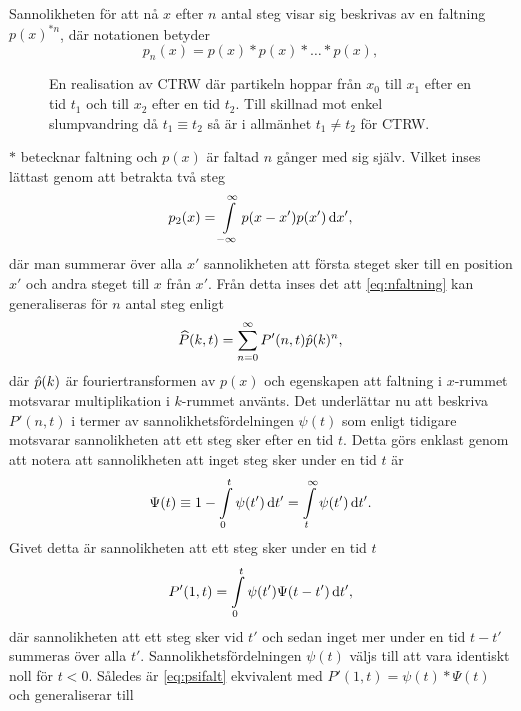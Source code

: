 Sannolikheten för att nå $x$ efter $n$ antal steg visar sig beskrivas av en faltning $p(x)^{*n}$, där notationen betyder 
\begin{equation}
p_n(x) = p(x)*p(x)*\ldots*p(x),
\end{equation}
\begin{figure}
    \centering
    
    \caption{En realisation av CTRW där partikeln hoppar från $x_0$ till $x_1$ efter en tid $t_1$ och till $x_2$ efter en tid $t_2$. Till skillnad mot enkel slumpvandring då $t_1\equiv t_2$ så är i allmänhet $t_1\neq t_2$ för CTRW.}
    \label{fig:CTRW}
\end{figure}
$*$ betecknar faltning och $p(x)$ är faltad $n$ gånger med sig själv. Vilket inses lättast genom att betrakta två steg
\begin{equation}\label{eq:nfaltning}
    p_2(x) = \int_{-\infty}^{\infty} p(x-x')p(x')\id{x'},
\end{equation}
där man summerar över alla $x'$ sannolikheten att första steget sker till en position $x'$ och andra steget till $x$ från $x'$. Från detta inses det att \eqref{eq:nfaltning} kan generaliseras för $n$ antal steg enligt
\begin{equation}\label{eq:Pfour}
\widehat{P} (k,t) =\sum_{n=0}^{\infty} P'(n,t)\hat{p} (k)^n,
\end{equation}
där $\hat{p} (k)$ är fouriertransformen av $p(x)$ och egenskapen att faltning i $x$-rummet motsvarar multiplikation i $k$-rummet använts. Det underlättar nu att beskriva $P'(n,t)$ i termer av sannolikhetsfördelningen $\psi (t)$ som enligt tidigare motsvarar sannolikheten att ett steg sker efter en tid $t$. Detta görs enklast genom att notera att sannolikheten att inget steg sker under en tid $t$ är 
\begin{equation}\label{eq:nojump}
\Psi (t) \equiv 1-\int_0^t \psi(t')\id{t'} = \int_t^{\infty} \psi(t')\id{t'}. 
\end{equation}
Givet detta är sannolikheten att ett steg sker under en tid $t$
\begin{equation}\label{eq:psifalt}
P'(1,t) = \int_0^t\psi(t')\Psi(t-t')\id{t'},
\end{equation}
där sannolikheten att ett steg sker vid $t'$ och sedan inget mer under en tid $t-t'$ summeras över alla $t'$. Sannolikhetsfördelningen $\psi (t)$ väljs till att vara identiskt noll för $t<0$. Således är \eqref{eq:psifalt} ekvivalent med $P'(1,t) = \psi(t)*\Psi(t)$ och generaliserar till
